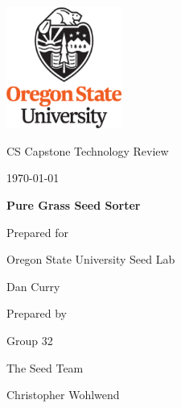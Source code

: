 \documentclass[onecolumn, draftclsnofoot,10pt, compsoc]{IEEEtran}
\def \CapstoneTeamName{		The Seed Team}
\def \CapstoneTeamNumber{		32}
\def \GroupMemberOne{			Bharath Padmaraju}
\def \GroupMemberTwo{			Kevin Deming}
\def \GroupMemberThree{			Haoxuan Zhan}
\def \GroupMemberFour{			Cong Yang}
\def \GroupMemberFive{			Christopher Wohlwend}
\def \CapstoneProjectName{		Pure Grass Seed Sorter}
\def \CapstoneSponsorCompany{	Oregon State University Seed Lab}
\def \CapstoneSponsorPerson{		Dan Curry}
\def \DocType{	%
				Technology Review
				}
\newcommand{\NameSigPair}[1]{\par
\makebox[2.75in][r]{#1} \hfil 	\makebox[3.25in]{\makebox[2.25in]{\hrulefill} \hfill		\makebox[.75in]{\hrulefill}}
\par\vspace{-12pt} \textit{\tiny\noindent
\makebox[2.75in]{} \hfil		\makebox[3.25in]{\makebox[2.25in][r]{Signature} \hfill	\makebox[.75in][r]{Date}}}}
\renewcommand{\NameSigPair}[1]{#1}
\begin{document}
\begin{titlepage}
    \begin{singlespace}
        \hfill 
        \includegraphics[height=4cm]{CompanyLogo}   
        \par\vspace{.2in}
        \centering
        \scshape{
            \huge CS Capstone \DocType \par
            {\large\today}\par
            \vspace{.5in}
            \textbf{\Huge\CapstoneProjectName}\par
            \vfill
            {\large Prepared for}\par
            \Huge \CapstoneSponsorCompany\par
            \vspace{5pt}
            {\Large\NameSigPair{\CapstoneSponsorPerson}\par}
            {\large Prepared by }\par
            Group\CapstoneTeamNumber\par
            \CapstoneTeamName\par 
            \vspace{5pt}
            {\Large
                \NameSigPair{\GroupMemberFive}\par
            }
            \vspace{20pt}
        }
        \begin{abstract}

\end{abstract}
\end{singlespace}
\end{titlepage}
\end{document}
